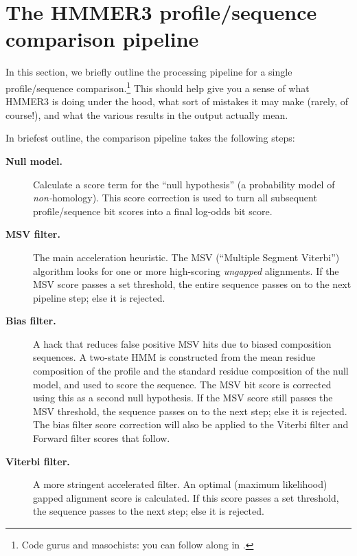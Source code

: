 
\section{The HMMER3 profile/sequence comparison pipeline}
\label{section:pipeline}
\setcounter{footnote}{0}

In this section, we briefly outline the processing pipeline for a
single profile/sequence comparison.\footnote{Code gurus and
  masochists: you can follow along in .} This
should help give you a sense of what HMMER3 is doing under the hood,
what sort of mistakes it may make (rarely, of course!), and what the
various results in the output actually mean.

In briefest outline, the comparison pipeline takes the following
steps:

\begin{description}
\item[\textbf{Null model.}] Calculate a score term for the ``null
  hypothesis'' (a probability model of \emph{non-}homology). This
  score correction is used to turn all subsequent profile/sequence bit
  scores into a final log-odds bit score.
  
\item[\textbf{MSV filter.}] The main acceleration heuristic. The MSV
  (``Multiple Segment Viterbi'') algorithm looks for one or more
  high-scoring \emph{ungapped} alignments. If the MSV score passes a
  set threshold, the entire sequence passes on to the next pipeline
  step; else it is rejected.

\item[\textbf{Bias filter.}] A hack that reduces false positive MSV
  hits due to biased composition sequences. A two-state HMM is
  constructed from the mean residue composition of the profile and the
  standard residue composition of the null model, and used to score
  the sequence. The MSV bit score is corrected using this as a second
  null hypothesis. If the MSV score still passes the MSV threshold,
  the sequence passes on to the next step; else it is rejected.  The
  bias filter score correction will also be applied to the Viterbi
  filter and Forward filter scores that follow.
  
\item[\textbf{Viterbi filter.}] A more stringent accelerated filter.
  An optimal (maximum likelihood) gapped alignment score is
  calculated. If this score passes a set threshold, the sequence
  passes to the next step; else it is rejected.


\end{description}
